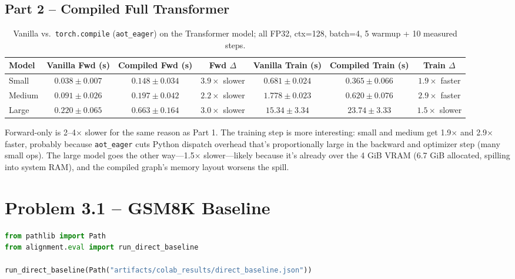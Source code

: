 \documentclass[11pt]{article}
\begin{document}
\subsection*{Part 2 -- Compiled Full Transformer}

\begin{table}[h]
\centering
\begin{tabular}{lcccccc}
\toprule
Model & Vanilla Fwd (s) & Compiled Fwd (s) & Fwd $\Delta$ & Vanilla Train (s) & Compiled Train (s) & Train $\Delta$ \\
\midrule
Small  & $0.038 \pm 0.007$ & $0.148 \pm 0.034$ & $3.9\times$ slower & $0.681 \pm 0.024$ & $0.365 \pm 0.066$ & $1.9\times$ faster \\
Medium & $0.091 \pm 0.026$ & $0.197 \pm 0.042$ & $2.2\times$ slower & $1.778 \pm 0.023$ & $0.620 \pm 0.076$ & $2.9\times$ faster \\
Large  & $0.220 \pm 0.065$ & $0.663 \pm 0.164$ & $3.0\times$ slower & $15.34 \pm 3.34$ & $23.74 \pm 3.33$ & $1.5\times$ slower \\
\bottomrule
\end{tabular}
\caption{Vanilla vs.\ \texttt{torch.compile} (\texttt{aot\_eager}) on the Transformer model; all FP32, ctx=128, batch=4, 5 warmup + 10 measured steps.}
\end{table}

Forward-only is 2--4$\times$ slower for the same reason as Part 1. The training step is more interesting: small and medium get 1.9$\times$ and 2.9$\times$ faster, probably because \texttt{aot\_eager} cuts Python dispatch overhead that's proportionally large in the backward and optimizer step (many small ops). The large model goes the other way---1.5$\times$ slower---likely because it's already over the 4 GiB VRAM (6.7 GiB allocated, spilling into system RAM), and the compiled graph's memory layout worsens the spill.


\section{Problem 3.1 -- GSM8K Baseline}

\begin{lstlisting}[language=Python]
from pathlib import Path
from alignment.eval import run_direct_baseline

run_direct_baseline(Path("artifacts/colab_results/direct_baseline.json"))
\end{lstlisting}
\end{document}
